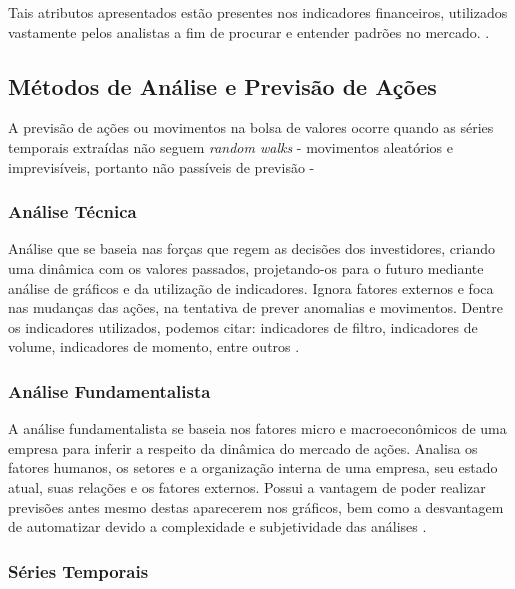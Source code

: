 \par
Tais atributos apresentados estão presentes nos indicadores financeiros, utilizados vastamente pelos analistas a fim de procurar e entender padrões no mercado. \cite{2006technical}.

\subsection{\textbf{Métodos de Análise e Previsão de Ações}}

\par A previsão de ações ou movimentos na bolsa de valores ocorre quando as séries temporais extraídas não seguem \textit{random walks} - movimentos aleatórios e imprevisíveis, portanto não passíveis de previsão \cite{jason} - \cite{castelao}

\subsubsection{Análise Técnica}

\par
Análise que se baseia nas forças que regem as decisões dos investidores, criando uma dinâmica com os valores passados, projetando-os para o futuro mediante análise de gráficos e da utilização de indicadores. Ignora fatores externos e foca nas mudanças das ações, na tentativa de prever anomalias e movimentos. Dentre os indicadores utilizados, podemos citar: indicadores de filtro, indicadores de volume, indicadores de momento, entre outros \cite{castelao}.

\subsubsection{Análise Fundamentalista}

\par
A análise fundamentalista se baseia nos fatores micro e macroeconômicos de uma empresa para inferir a respeito da dinâmica do mercado de ações. Analisa os fatores humanos, os setores e a organização interna de uma empresa, seu estado atual, suas relações e os fatores externos. Possui a vantagem de poder realizar previsões antes mesmo destas aparecerem nos gráficos, bem como a desvantagem de automatizar devido a complexidade e subjetividade das análises \cite{castelao}.

\subsubsection{Séries Temporais}

